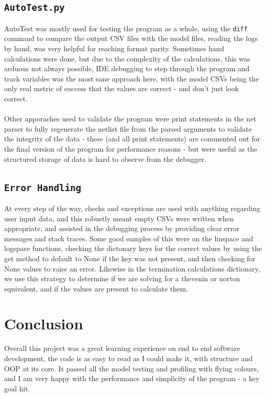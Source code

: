 \documentclass[conference]{IEEEtran}
\begin{document}
\subsection{\textbf{\texttt{AutoTest.py}}}
AutoTest was mostly used for testing the program as a whole, using the \texttt{diff} command to compare the output CSV files with the model files, reading the logs by hand, was very helpful
for reaching format parity. Sometimes hand calculations were done, but due to the complexity of the calculations, this was arduous not always possible, IDE debugging to step through the program and track
variables was the most sane approach here, with the model CSVs being the only real metric of success that the values are correct - and don't just look correct.
\\\\
Other apporaches used to validate the program were print statements in the net parser to fully regenerate the netlist file from the parsed arguments to validate the integrity of the data - these (and all print statements) are
commented out for the final version of the program for performance reasons - but were useful as the structured storage of data is hard to observe from the debugger.

\subsection{\textbf{\texttt{Error Handling}}}

At every step of the way, checks and exceptions are used with anything regarding user input data, and this robustly meant empty CSVs were written when appropriate, and assisted in the debugging process
by providing clear error messages and stack traces. Some good eamples of this were on the linspace and logspace functions, checking the dictonary keys for the correct values by using the get method 
to default to None if the key was not present, and then checking for None values to raise an error. Likewise in the termination calculations dictionary, we use this strategy to determine if we are solving
for a thevenin or norton equivalent, and if the values are present to calculate them.

\section{Conclusion}

Overall this project was a great learning experience on end to end software development, the code is as easy to read as I could make it, with structure and OOP at its core.
It passed all the model testing and profiling with flying colours, and I am very happy with the performance and simplicity of the program - a key goal hit.
\end{document}
